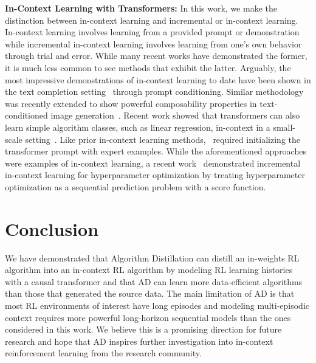 \documentclass{article}
\theoremstyle{thm}
\newcommand{\fullname}{Algorithm Distillation }
\newcommand{\name}{AD }
\begin{document}
{\bf In-Context Learning with Transformers:} In this work, we make the distinction between in-context learning and incremental or in-context learning. In-context learning involves learning from a provided prompt or demonstration while incremental in-context learning involves learning from one's own behavior through trial and error.
While many recent works have demonstrated the former, it is much less common to see methods that exhibit the latter. Arguably, the most impressive demonstrations of in-context learning to date have been shown in the text completion setting~\citep{radford2018improving, chen2020igpt, brown2020gpt3} through prompt conditioning. Similar methodology was recently extended to show powerful composability properties in text-conditioned image generation~\citep{yu2022parti}. Recent work showed that transformers can also learn simple algorithm classes, such as linear regression, in-context in a small-scale setting~\citep{garg2022incontext}. Like prior in-context learning methods,~\citet{garg2022incontext} required initializing the transformer prompt with expert examples. While the aforementioned approaches were examples of in-context learning, a recent work~\citep{chen2022optformer} demonstrated incremental in-context learning for hyperparameter optimization by treating hyperparameter optimization as a sequential prediction problem with a score function.
\section{Conclusion}
We have demonstrated that \fullname can distill an in-weights RL algorithm into an in-context RL algorithm by modeling RL learning histories with a causal transformer and that \name can learn more data-efficient algorithms than those that generated the source data. The main limitation of \name is that most RL environments of interest have long episodes and modeling multi-episodic context requires more powerful long-horizon sequential models than the ones considered in this work. We believe this is a promising direction for future research and hope that \name inspires further investigation into in-context reinforcement learning from the research community.


\appendix
\newpage
\end{document}
